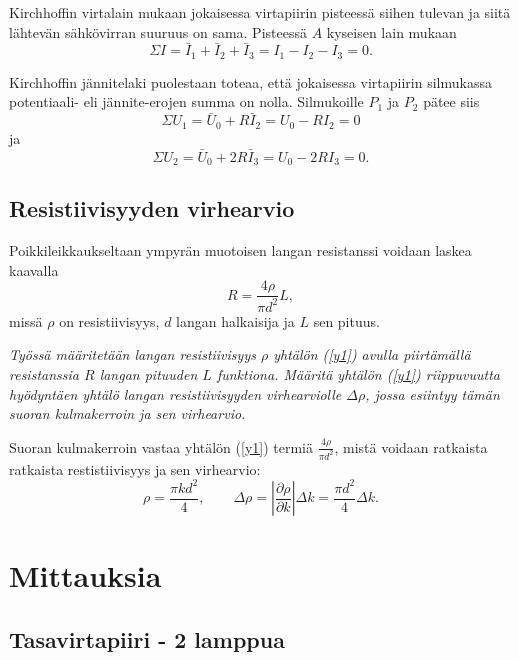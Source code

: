 \documentclass[a4paper,11pt]{article}
\begin{document}
{Kirchhoffin virtalain mukaan jokaisessa virtapiirin pisteessä siihen tulevan ja siitä lähtevän sähkövirran suuruus on sama. Pisteessä $A$ kyseisen lain mukaan
\begin{equation*}
    \Sigma I = \bar{I}_1 + \bar{I}_2 + \bar{I}_3 = I_1 - I_2 - I_3 = 0.
\end{equation*}

Kirchhoffin jännitelaki puolestaan toteaa, että jokaisessa virtapiirin silmukassa potentiaali- eli jännite-erojen summa on nolla. Silmukoille $P_1$ ja $P_2$ pätee siis
\begin{equation*}
    \Sigma U_1 = \bar{U}_0 + R \bar{I}_2 = U_0 - R I_2 = 0
\end{equation*}
ja
\begin{equation*}
    \Sigma U_2 = \bar{U}_0 + 2R \bar{I}_3 = U_0 - 2R I_3 = 0.
\end{equation*}

\subsection{Resistiivisyyden virhearvio}

Poikkileikkaukseltaan ympyrän muotoisen langan resistanssi voidaan laskea kaavalla
\begin{equation}
\label{y1}
    R = \frac{4\rho}{\pi d^2}L,
\end{equation}
missä $\rho$ on resistiivisyys, $d$ langan halkaisija ja $L$ sen pituus.

\textit{Työssä määritetään langan resistiivisyys $\rho$ yhtälön (\ref{y1}) avulla piirtämällä resistanssia $R$ langan
pituuden $L$ funktiona. Määritä yhtälön (\ref{y1}) riippuvuutta hyödyntäen yhtälö langan resistiivisyyden virhearviolle $\Delta \rho$, jossa esiintyy tämän suoran kulmakerroin ja sen virhearvio.}

Suoran kulmakerroin vastaa yhtälön (\ref{y1}) termiä $\frac{4\rho}{\pi d^2}$, mistä voidaan ratkaista ratkaista restistiivisyys ja sen virhearvio:
\begin{equation}
\label{y2}
    \rho  = \frac{\pi k d^2}{4}, \qquad \Delta \rho  = \left\vert\frac{\partial \rho}{\partial k}\right\vert \Delta k = \frac{\pi d^2}{4} \Delta k.
\end{equation}

\section{Mittauksia}

\subsection{Tasavirtapiiri - 2 lamppua}
\label{2lamppua}

}
\end{document}
